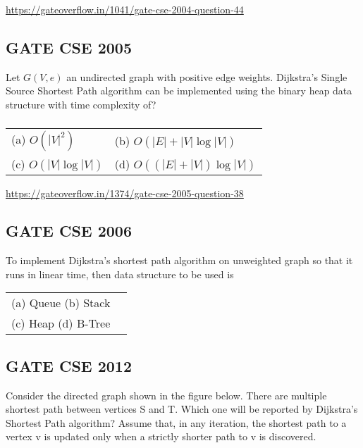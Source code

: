 \documentclass[a4paper,14pt]{extarticle}
\begin{document}
\url{https://gateoverflow.in/1041/gate-cse-2004-question-44}

\newpage
\subsection{GATE CSE 2005}
Let $G(V, e)$ an undirected graph with positive edge weights. Dijkstra's Single Source
Shortest Path algorithm can be implemented using the binary heap data structure with 
time complexity of?
\subsubsection*{}
\begin{tabular}{ll}
(a) $O\left(|V|^2\right)$ \hspace{4cm} & (b) $O\left(|E|+|V|\log |V|\right)$ \\
(c) $O\left(|V|\log|V|\right)$ \hspace{4cm} & (d) $O\left(\left(|E|+|V|\right)\log|V|\right)$ \\
\end{tabular}
\vspace{0.5cm}

\url{https://gateoverflow.in/1374/gate-cse-2005-question-38}

\subsection{GATE CSE 2006}
To implement Dijkstra's shortest path algorithm on unweighted graph so that it runs in linear time,
then data structure to be used is 

\begin{tabular}{ll}
    (a) Queue \hspace{5cm} (b) Stack\\
    (c) Heap \hspace{5cm}  (d) B-Tree\\
\end{tabular}

\newpage
\subsection{GATE CSE 2012}
Consider the directed graph shown in the figure below. There are 
multiple shortest path between vertices S and T. Which one 
will be reported by Dijkstra's Shortest Path algorithm?
Assume that, in any iteration, the shortest path to a vertex v is 
updated only when a strictly shorter path to v is 
discovered.
\end{document}

